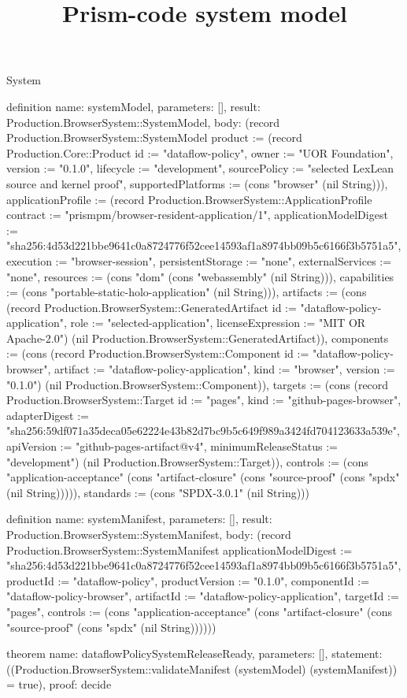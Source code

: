 \begin{lexlean}{System}
\title{Prism-code system model}
\begin{semanticmodule}
definition{
  name: systemModel,
  parameters: [],
  result: Production.BrowserSystem::SystemModel,
  body: (record Production.BrowserSystem::SystemModel {product := (record Production.Core::Product {id := "dataflow-policy", owner := "UOR Foundation", version := "0.1.0", lifecycle := "development", sourcePolicy := "selected LexLean source and kernel proof", supportedPlatforms := (cons "browser" (nil String))}), applicationProfile := (record Production.BrowserSystem::ApplicationProfile {contract := "prismpm/browser-resident-application/1", applicationModelDigest := "sha256:4d53d221bbe9641c0a8724776f52cee14593af1a8974bb09b5c6166f3b5751a5", execution := "browser-session", persistentStorage := "none", externalServices := "none", resources := (cons "dom" (cons "webassembly" (nil String))), capabilities := (cons "portable-static-holo-application" (nil String))}), artifacts := (cons (record Production.BrowserSystem::GeneratedArtifact {id := "dataflow-policy-application", role := "selected-application", licenseExpression := "MIT OR Apache-2.0"}) (nil Production.BrowserSystem::GeneratedArtifact)), components := (cons (record Production.BrowserSystem::Component {id := "dataflow-policy-browser", artifact := "dataflow-policy-application", kind := "browser", version := "0.1.0"}) (nil Production.BrowserSystem::Component)), targets := (cons (record Production.BrowserSystem::Target {id := "pages", kind := "github-pages-browser", adapterDigest := "sha256:59df071a35deca05e62224e43b82d7bc9b5c649f989a3424fd704123633a539e", apiVersion := "github-pages-artifact@v4", minimumReleaseStatus := "development"}) (nil Production.BrowserSystem::Target)), controls := (cons "application-acceptance" (cons "artifact-closure" (cons "source-proof" (cons "spdx" (nil String))))), standards := (cons "SPDX-3.0.1" (nil String))})
}

definition{
  name: systemManifest,
  parameters: [],
  result: Production.BrowserSystem::SystemManifest,
  body: (record Production.BrowserSystem::SystemManifest {applicationModelDigest := "sha256:4d53d221bbe9641c0a8724776f52cee14593af1a8974bb09b5c6166f3b5751a5", productId := "dataflow-policy", productVersion := "0.1.0", componentId := "dataflow-policy-browser", artifactId := "dataflow-policy-application", targetId := "pages", controls := (cons "application-acceptance" (cons "artifact-closure" (cons "source-proof" (cons "spdx" (nil String)))))})
}

theorem{
  name: dataflowPolicySystemReleaseReady,
  parameters: [],
  statement: ((Production.BrowserSystem::validateManifest (systemModel) (systemManifest)) = true),
  proof: decide{}
}
\end{semanticmodule}
\end{lexlean}
